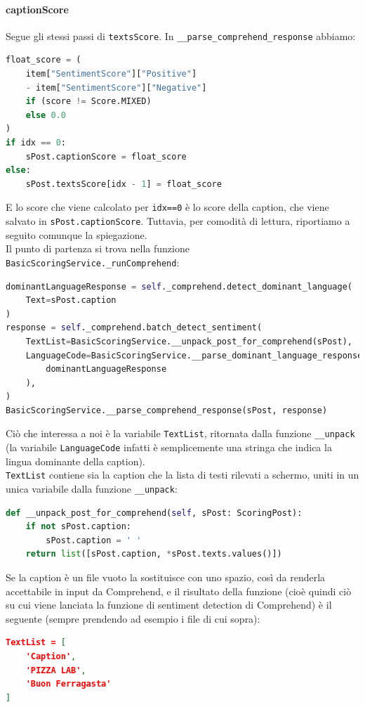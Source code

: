 \paragraph{captionScore} \aCapo
Segue gli stessi passi di \verb+textsScore+. In \verb+__parse_comprehend_response+ abbiamo:
\begin{lstlisting}[language=Python]
float_score = (
    item["SentimentScore"]["Positive"] 
    - item["SentimentScore"]["Negative"]
    if (score != Score.MIXED)
    else 0.0
)
if idx == 0:
    sPost.captionScore = float_score
else:
    sPost.textsScore[idx - 1] = float_score
\end{lstlisting}
E lo score che viene calcolato per \verb+idx==0+ è lo score della
caption, che viene salvato in \verb+sPost.captionScore+.\aCapo
Tuttavia, per comodità di lettura, riportiamo a seguito comunque la spiegazione.\\
Il punto di partenza si trova nella funzione \verb+BasicScoringService._runComprehend+:
\begin{lstlisting}[language=Python]
dominantLanguageResponse = self._comprehend.detect_dominant_language(
    Text=sPost.caption
)
response = self._comprehend.batch_detect_sentiment(
    TextList=BasicScoringService.__unpack_post_for_comprehend(sPost),
    LanguageCode=BasicScoringService.__parse_dominant_language_response(
        dominantLanguageResponse
    ),
)
BasicScoringService.__parse_comprehend_response(sPost, response)
\end{lstlisting}
Ciò che interessa a noi è la variabile \verb+TextList+, ritornata dalla funzione \verb+__unpack+ 
(la variabile \verb+LanguageCode+ infatti è semplicemente una stringa che indica la lingua dominante della caption).\\
\verb+TextList+ contiene sia la caption che la lista di testi rilevati a schermo, uniti in un
unica variabile dalla funzione \verb+__unpack+:
\begin{lstlisting}[language=Python]
def __unpack_post_for_comprehend(self, sPost: ScoringPost):
    if not sPost.caption:
        sPost.caption = ' '  
    return list([sPost.caption, *sPost.texts.values()])
\end{lstlisting}
Se la caption è un file vuoto la sostituisce con uno spazio, così da renderla accettabile in input
da Comprehend, e il risultato della funzione (cioè quindi ciò su cui viene lanciata la funzione di
sentiment detection di Comprehend) è il seguente (sempre prendendo ad esempio i file di cui sopra):
\begin{lstlisting}[language=JSON]
TextList = [
    'Caption',
    'PIZZA LAB',
    'Buon Ferragasta'
]
\end{lstlisting}
